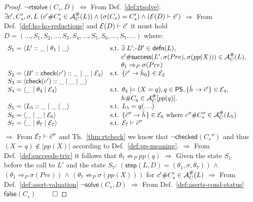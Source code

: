 \documentclass{llncs}
\newcommand{\PS}{\textsf{PS}}
\newcommand{\AC}
  {\ensuremath{{\cal A}_{C}}}
\newcommand{\LabAClit}[1]
  {\ensuremath{\AC^{\#}(#1)}}
\newcommand{\LabACpp}[1]
  {\ensuremath{\AC^{\#}[#1]}}
\newcommand{\gd}[0]{\mid}
\newcommand{\exstate}[3]
  {\ensuremath{\langle #1 \gd{} #2 \gd{} #3 \rangle}}
\newcommand{\ADeps}{\ensuremath{{\cal E}}}
\newcommand{\defn}[1]
  {\ensuremath{\textsf{defn}(#1)}}
\newcommand{\rtsolve}[2]
  {\textsf{rtsolve}(#1,#2)}
\newcommand{\clause}[2]
  {\ensuremath{#1 \textsf{:-} #2}}
\newcommand{\asrId}[1]{\ensuremath{c_{#1}}}
\newcommand{\negAsrId}[1]{\ensuremath{\bar{c}_{#1}}}
\newcommand{\hypId}[1]{\ensuremath{h_{#1}}}
\newcommand{\negHypId}[1]{\ensuremath{\bar{h}_{#1}}}
\newcommand{\checkedAsr}[1]{\ensuremath{\textsf{checked}(#1)}}
\newcommand{\falseAsr}[1]{\ensuremath{\textsf{false}(#1)}}
\newcommand{\checkLitLab}[1]{\ensuremath{\textsf{check}(#1)}}
\newcommand{\successAsr}[3]{\ensuremath{\textsf{success}(#1, #2, #3)}}
\begin{document}
\begin{proof}
\hfill\newline  
  $\neg\rtsolve{C_s}{D}$
\newline
  $\Leftrightarrow$ From Def.~\ref{def:rtsolve}: 
  $\exists \asrId{}', C_s', \sigma, L ~ (\asrId{}'\#C_s' \in \LabAClit{L})
    \wedge (\sigma(C_s) = C_s') \wedge (\ADeps(D) \vdash \negAsrId{}')$
\newline
  $\Rightarrow$ From Def.~\ref{def:ho-ho-reductions} and $\ADeps(D)
  \vdash \negAsrId{}'$ it must hold 
  $D =
  (\ldots,S_1,S_2,\ldots,S_3,S_4,\ldots,S_5,S_6,\ldots,S_7,\ldots)$
  where: 
  \[
  \begin{array}{ll}
    S_1 = \exstate{L'::\_}{\theta_1}{\_} & \text{s.t.}~
      \exists\; \clause{L'}{B'} \in \defn{L}, \\
    & ~~~~~\asrId{}'\#\successAsr{L'}{\sigma(Pre)}{\sigma(pp(X))} \in
      \LabAClit{L}, 
    \\
    & ~~~~~\theta_1 \Rightarrow_P \sigma(Pre) 
    \\
    S_2 = \exstate{B'::\checkLitLab{\asrId{}'}::\_}{\_}{\ADeps_2} 
    & \text{s.t. }
      \{\negAsrId{}' \rightarrow \negHypId{0}\} \in \ADeps_2
    \\
    S_3 = \exstate{\checkLitLab{\asrId{}'}::\_}{\_}{\_}
    &
    \\
    S_4 = \exstate{\_}{\theta_4}{\ADeps_4} 
    & \text{s.t. }\theta_4 \models (X = q), q \in \PS, 
     \{\negHypId{} \rightarrow \negAsrId{}'\} \in \ADeps_4,
    \\
    & ~~~~~\hypId{}\#C_q \in \LabACpp{pp(q)}.
    \\
    S_5 = \exstate{L_5::\_}{\_}{\_}
    & \text{s.t. } L_5 = q(\ldots)
    \\
    S_{6} = \exstate{\_}{\_}{\ADeps_6}
    & \text{s.t. } \{\negAsrId{}'' \rightarrow \negHypId{}\} \in
     \ADeps_6 \text{ where } \asrId{}''\#C_s'' \in \LabAClit{L_5}
    \\
    S_7 = \exstate{\_}{\theta_7}{\ADeps_7}
    & \text{s.t. } \ADeps_7 \vdash \negAsrId{}''
  \end{array}
  \] 
  $\Rightarrow$ From $\ADeps_7 \vdash \negAsrId{}''$ and
  Th.~\ref{thm:rtcheck} we know that $\neg\checkedAsr{C_s''}$
  and thus $(X = q) \not\in |pp(X)|$ according to
  Def.~\ref{def:pp-meaning}.
\newline
  $\Rightarrow$ From Def.~\ref{def:succeeds-triv} it follows that 
  $\theta_7 \not\Rightarrow_P pp(q)$
\newline
  $\Rightarrow$ Given the state $S_1$ before the call to $L'$ and the
  state $S_7$: 
  $(\textsf{step}(L,D)=(\theta_1,\sigma,\theta_7))$ $\wedge$
  $(\theta_1 \Rightarrow_P \sigma(Pre))$ $\wedge$
  $(\theta_7 \not\Rightarrow_P \sigma(pp(X)))$ for
  $\asrId{}'\#C_s' \in \LabAClit{L}$
\newline
  $\Rightarrow$ From Def.~\ref{def:assrt-valuation}
  $\neg\textsf{solve}(C_s,D)$
$\Rightarrow$ From Def.~\ref{def:assrts-cond-status} $\falseAsr{C_s}$
  \hfill $\qed$

\end{proof}
\end{document}
